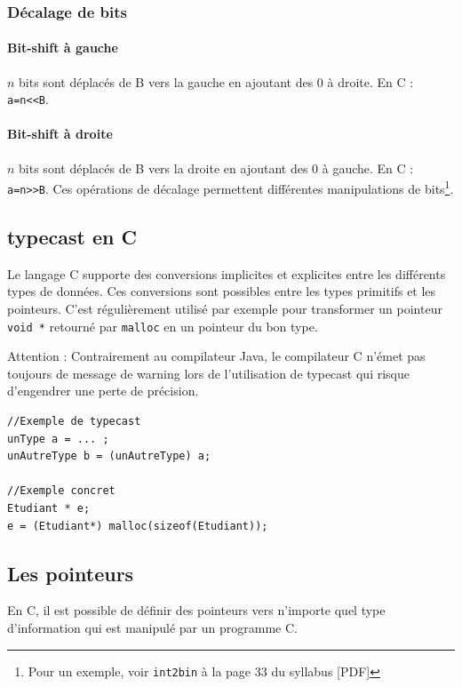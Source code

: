 \subsubsection{Décalage de bits}
\paragraph{Bit-shift à gauche} $n$ bits sont déplacés de B vers la gauche en ajoutant des 0 à droite.
En C : \texttt{a=n<<B}.
\paragraph{Bit-shift à droite} $n$ bits sont déplacés de B vers la droite en ajoutant des 0 à gauche.
En C : \texttt{a=n>>B}.
Ces opérations de décalage permettent différentes manipulations de bits\footnote{Pour un exemple, voir \texttt{int2bin} à la page 33 du syllabus [PDF]}.


\subsection{typecast en C}
Le langage C supporte des conversions implicites et explicites entre les différents types de données.
Ces conversions sont possibles entre les types primitifs et les pointeurs.
C'est régulièrement utilisé par exemple pour transformer un pointeur \texttt{void *} retourné par \texttt{malloc} en un pointeur du bon type.

Attention : Contrairement au compilateur Java, le compilateur C n'émet pas toujours de message de warning lors de l'utilisation de typecast qui risque d'engendrer une perte de précision.

\begin{lstlisting}[emph={unType,unAutreType,Etudiant},emphstyle={\color{blue}\bfseries}]
//Exemple de typecast
unType a = ... ;
unAutreType b = (unAutreType) a;

//Exemple concret
Etudiant * e;
e = (Etudiant*) malloc(sizeof(Etudiant));
\end{lstlisting}



\subsection{Les pointeurs}
En C, il est possible de définir des pointeurs vers n'importe quel type d'information qui est manipulé par un programme C.


